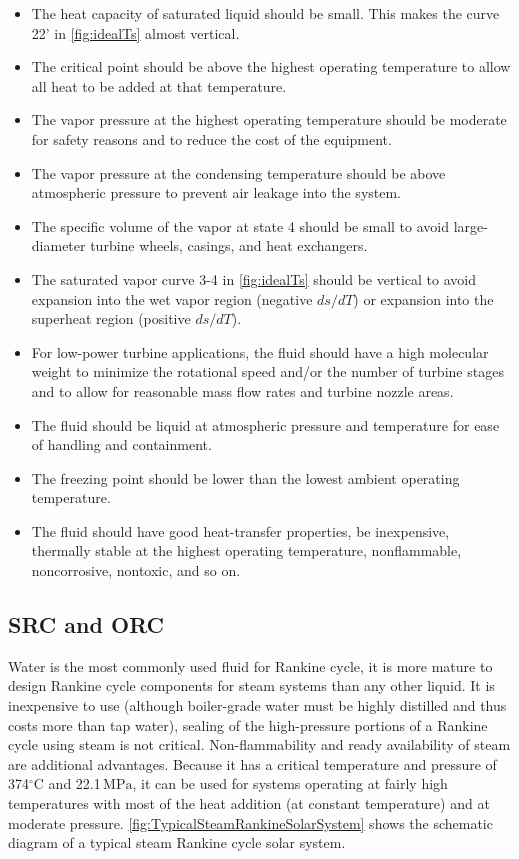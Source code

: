 \begin{itemize}
  \item The heat capacity of saturated liquid should be small. This makes the curve 22' in \autoref{fig:idealTs} almost vertical.
  \item The critical point should be above the highest operating temperature to allow all heat to be added at that temperature.
  \item The vapor pressure at the highest operating temperature should be moderate for safety reasons and to reduce the cost of the equipment.
  \item The vapor pressure at the condensing temperature should be above atmospheric pressure to prevent air leakage into the system.
  \item The specific volume of the vapor at state 4 should be small to avoid large-diameter turbine wheels, casings, and heat exchangers.
  \item The saturated vapor curve 3-4 in \autoref{fig:idealTs} should be vertical to avoid expansion into the wet vapor region (negative $ds/dT$) or expansion into the superheat region (positive $ds/dT$).
  \item For low-power turbine applications, the fluid should have a high molecular weight to minimize the rotational speed and/or the number of turbine stages and to allow for reasonable mass flow rates and turbine nozzle areas.
  \item The fluid should be liquid at atmospheric pressure and temperature for ease of handling and containment.
  \item The freezing point should be lower than the lowest ambient operating temperature.
  \item The fluid should have good heat-transfer properties, be inexpensive, thermally stable at the highest operating temperature, nonflammable, noncorrosive, nontoxic, and so on.
\end{itemize}

\subsection{SRC and ORC}

Water is the most commonly used fluid for Rankine cycle, it is more mature to design Rankine cycle components for steam systems than any other liquid. It is inexpensive to use (although boiler-grade water must be highly distilled and thus costs more than tap water), sealing of the high-pressure portions of a Rankine cycle using steam is not critical. Non-flammability and ready availability of steam are additional advantages. Because it has a critical temperature and pressure of 374$\mathrm{^\circ C}$ and 22.1$\,\mathrm{MPa}$, it can be used for systems operating at fairly high temperatures with most of the heat addition (at constant temperature) and at moderate pressure. \autoref{fig:TypicalSteamRankineSolarSystem} shows the schematic diagram of a typical steam Rankine cycle solar system.

